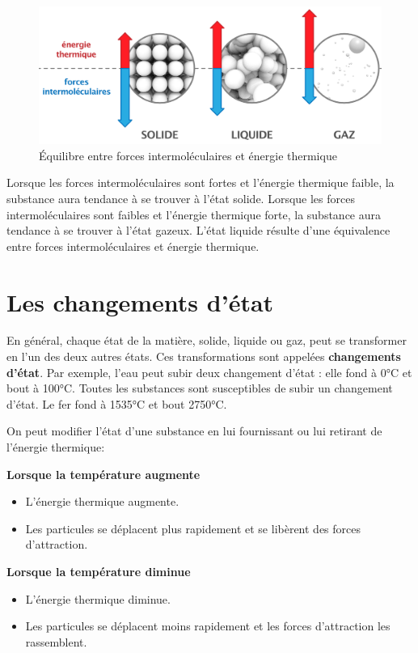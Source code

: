 \documentclass[
  11pt,
  a4paper,
  openany]{book}
\providecommand{\tightlist}{%
  \setlength{\itemsep}{0pt}\setlength{\parskip}{0pt}}
\begin{document}
\begin{figure}

{\centering \includegraphics[width=0.67\linewidth]{images/mvt-thermique} 

}

\caption{Équilibre entre forces intermoléculaires et énergie thermique}\label{fig:mvt-thermique}
\end{figure}

Lorsque les forces intermoléculaires sont fortes et l'énergie thermique faible, la substance aura tendance à se trouver à l'état solide. Lorsque les forces intermoléculaires sont faibles et l'énergie thermique forte, la substance aura tendance à se trouver à l'état gazeux. L'état liquide résulte d'une équivalence entre forces intermoléculaires et énergie thermique.

\section{Les changements d'état}\label{les-changements-duxe9tat}

En général, chaque état de la matière, solide, liquide ou gaz, peut se transformer en l'un des deux autres états. Ces transformations sont appelées \textbf{changements d'état}. Par exemple, l'eau peut subir deux changement d'état : elle fond à 0°C et bout à 100°C. Toutes les substances sont susceptibles de subir un changement d'état. Le fer fond à 1535°C et bout 2750°C.

On peut modifier l'état d'une substance en lui fournissant ou lui retirant de l'énergie thermique:

\textbf{Lorsque la température augmente}

\begin{itemize}
\tightlist
\item
  L'énergie thermique augmente.
\item
  Les particules se déplacent plus rapidement et se libèrent des forces d'attraction.
\end{itemize}

\textbf{Lorsque la température diminue}

\begin{itemize}
\tightlist
\item
  L'énergie thermique diminue.
\item
  Les particules se déplacent moins rapidement et les forces d'attraction les rassemblent.
\end{itemize}
\end{document}
